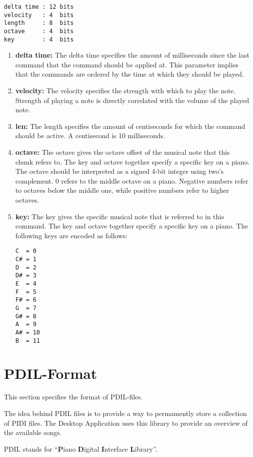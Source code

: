 \begin{verbatim}
delta time : 12 bits
velocity   : 4  bits
length     : 8  bits
octave     : 4  bits
key        : 4  bits
\end{verbatim}

\begin{enumerate}
	\item \textbf{delta time:} The delta time specifies the amount of milliseconds since the last command that the command should be applied at. This parameter implies that the commands are ordered by the time at which they should be played.
	\item \textbf{velocity:} The velocity specifies the strength with which to play the note. Strength of playing a note is directly correlated with the volume of the played note.
	\item \textbf{len:} The length specifies the amount of centiseconds for which the command should be active. A centisecond is 10 milliseconds.
	\item \textbf{octave:} The octave gives the octave offset of the musical note that this chunk refers to. The key and octave together specify a specific key on a piano. The octave should be interpreted as a signed 4-bit integer using two's complement. 0 refers to the middle octave on a piano. Negative numbers refer to octaves below the middle one, while positive numbers refer to higher octaves.
	\item \textbf{key:} The key gives the specific musical note that is referred to in this command. The key and octave together specify a specific key on a piano. The following keys are encoded as follows:
	\begin{verbatim}
C  = 0
C# = 1
D  = 2
D# = 3
E  = 4
F  = 5
F# = 6
G  = 7
G# = 8
A  = 9
A# = 10
B  = 11
	\end{verbatim}
\end{enumerate}


\section{PDIL-Format} \label{appendix-pdil}

This section specifies the format of PDIL-files.

The idea behind PDIL files is to provide a way to permamently store a collection of PIDI files. The Desktop Application uses this library to provide an overview of the available songs.

PDIL stands for \enquote{\textbf{P}iano \textbf{D}igital \textbf{I}nterface \textbf{L}ibrary}.

